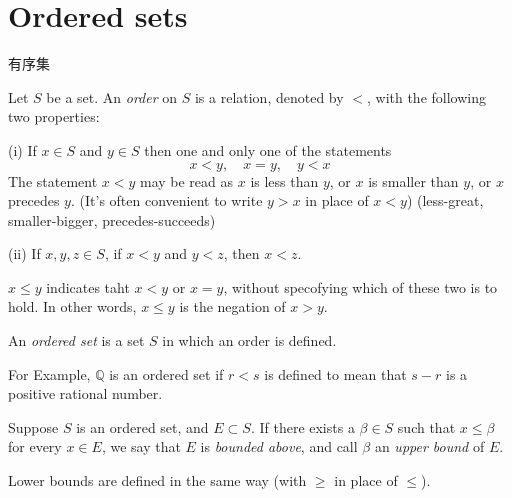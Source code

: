 
\section{Ordered sets}
有序集

\begin{myDef}\label{myDef:1.5}
Let $S$ be a set. An \emph{order} on $S$ is a relation, denoted by $<$, with the following two properties:

(i) If $x\in S$ and $y\in S$ then one and only one of the statements
\begin{equation*}
    x<y, \quad
    x=y, \quad
    y<x
\end{equation*}
The statement $x<y$ may be read as 
$x$ is less than $y$, or 
$x$ is smaller than $y$, or
$x$ precedes $y$.
(It's often convenient to write $y>x$ in place of $x<y$)
(less-great, smaller-bigger, precedes-succeeds)

(ii) If $x,y,z\in S$, if $x<y$ and $y<z$, then $x<z$.

$x\leq y$ indicates taht $x<y$ or $x=y$, without specofying which of these two is to hold.
In other words, $x\leq y$ is the negation of $x>y$.
\end{myDef}



\begin{myDef}\label{myDef:1.6}
An \emph{ordered set} is a set $S$ in which an order is defined.
\end{myDef}

For Example, $\mathbb{Q}$ is an ordered set if $r<s$ is defined to mean that $s-r$ is a positive rational number.


\begin{myDef}\label{myDef:1.7}
Suppose $S$ is an ordered set, and $E \subset S$. If there exists a
$\beta \in S$ such that $x \leq \beta$ for every $x \in E$, we say that $E$ is \emph{bounded above}, and call
$\beta$ an \emph{upper bound} of $E$.

Lower bounds are defined in the same way (with $\geq$ in place of $\leq$).
\end{myDef}

